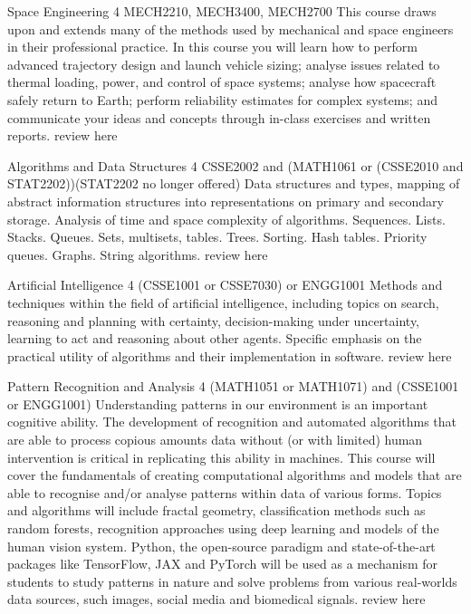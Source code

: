 	{Space Engineering}
	{4}
	{MECH2210, MECH3400, MECH2700}
	{}
	{}
	{This course draws upon and extends many of the methods used by mechanical and space engineers in their professional practice. In this course you will learn how to perform advanced trajectory design and launch vehicle sizing; analyse issues related to thermal loading, power, and control of space systems; analyse how spacecraft safely return to Earth; perform reliability estimates for complex systems; and communicate your ideas and concepts through in-class exercises and written reports.}
	{review here}

	{Algorithms and Data Structures}
	{4}
	{CSSE2002 and (MATH1061 or (CSSE2010 and STAT2202))(STAT2202 no longer offered)}
	{}
	{}
	{Data structures and types, mapping of abstract information structures into representations on primary and secondary storage. Analysis of time and space complexity of algorithms. Sequences. Lists. Stacks. Queues. Sets, multisets, tables. Trees. Sorting. Hash tables. Priority queues. Graphs. String algorithms.}
	{review here}

	{Artificial Intelligence}
	{4}
	{(CSSE1001 or CSSE7030) or ENGG1001}
	{}
	{}
	{Methods and techniques within the field of artificial intelligence, including topics on search, reasoning and planning with certainty, decision-making under uncertainty, learning to act and reasoning about other agents. Specific emphasis on the practical utility of algorithms and their implementation in software.}
	{review here}

	{Pattern Recognition and Analysis}
	{4}
	{(MATH1051 or MATH1071) and (CSSE1001 or ENGG1001)}
	{}
	{}
	{Understanding patterns in our environment is an important cognitive ability. The development of recognition and automated algorithms that are able to process copious amounts data without (or with limited) human intervention is critical in replicating this ability in machines. This course will cover the fundamentals of creating computational algorithms and models that are able to recognise and/or analyse patterns within data of various forms. Topics and algorithms will include fractal geometry, classification methods such as random forests, recognition approaches using deep learning and models of the human vision system. Python, the open-source paradigm and state-of-the-art packages like TensorFlow, JAX and PyTorch will be used as a mechanism for students to study patterns in nature and solve problems from various real-worlds data sources, such images, social media and biomedical signals.}
	{review here}

